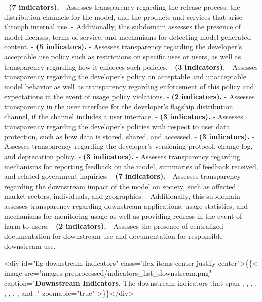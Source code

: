 \documentclass[screen, authorversion, acmsmall]{acmart}
\begin{document}
-  \textbf{\distribution (7 indicators).}
- Assesses transparency regarding the release process, the distribution channels for the model, and the products and services that arise through internal use.
- Additionally, this subdomain assesses the presence of model licenses, terms of service, and mechanisms for detecting model-generated content.
-  \textbf{\usagepolicy (5 indicators).}
- Assesses transparency regarding the developer's acceptable use policy such as restrictions on specific uses or users, as well as transparency regarding how it enforces such policies.
-  \textbf{\modelbehaviorpolicy (3 indicators).}
- Assesses transparency regarding the developer's policy on acceptable and unacceptable model behavior as well as transparency regarding enforcement of this policy and expectations in the event of usage policy violations.
-  \textbf{\interface (2 indicators).}
- Assesses transparency in the user interface for the developer's flagship distribution channel, if the channel includes a user interface.
-  \textbf{\dataprotection (3 indicators).}
- Assesses transparency regarding the developer's policies with respect to user data protection, such as how data is stored, shared, and accessed.
-  \textbf{\updates(3 indicators).}
- Assesses transparency regarding the developer's versioning protocol, change log, and deprecation policy.
-  \textbf{\feedback (3 indicators).}
- Assesses transparency regarding mechanisms for reporting feedback on the model, summaries of feedback received, and related government inquiries.
-  \textbf{\impact (7 indicators).}
- Assesses transparency regarding the downstream impact of the model on society, such as affected market sectors, individuals, and geographies.
- Additionally, this subdomain assesses transparency regarding downstream applications, usage statistics, and mechanisms for monitoring usage as well as providing redress in the event of harm to users.
-  \textbf{\documentation (2 indicators).}
- Assesses the presence of centralized documentation for downstream use and documentation for responsible downstream use.

<div id="fig-downstream-indicators" class="flex items-center justify-center">\{\{< image src="images-preprocessed/indicators_list_downstream.png" caption="\textbf{Downstream Indicators.}  The \numdownstreamindicators downstream indicators that span \distribution, \usagepolicy, \modelbehaviorpolicy, \interface, \dataprotection, \updates, \feedback, \impact, and \documentation." zoomable="true" >\}\}</div>
\end{document}
